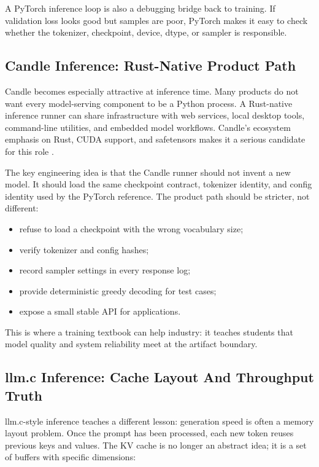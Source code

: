 A PyTorch inference loop is also a debugging bridge back to training. If validation loss
looks good but samples are poor, PyTorch makes it easy to check whether the tokenizer,
checkpoint, device, dtype, or sampler is responsible.

\subsection{Candle Inference: Rust-Native Product Path}

Candle becomes especially attractive at inference time. Many products do not want every
model-serving component to be a Python process. A Rust-native inference runner can share
infrastructure with web services, local desktop tools, command-line utilities, and
embedded model workflows. Candle's ecosystem emphasis on Rust, CUDA support, and
safetensors makes it a serious candidate for this role \cite{huggingfacecandle}.

The key engineering idea is that the Candle runner should not invent a new model. It
should load the same checkpoint contract, tokenizer identity, and config identity used by
the PyTorch reference. The product path should be stricter, not different:

\begin{itemize}
  \item refuse to load a checkpoint with the wrong vocabulary size;
  \item verify tokenizer and config hashes;
  \item record sampler settings in every response log;
  \item provide deterministic greedy decoding for test cases;
  \item expose a small stable API for applications.
\end{itemize}

This is where a training textbook can help industry: it teaches students that model
quality and system reliability meet at the artifact boundary.

\subsection{llm.c Inference: Cache Layout And Throughput Truth}

llm.c-style inference teaches a different lesson: generation speed is often a memory
layout problem. Once the prompt has been processed, each new token reuses previous keys
and values. The KV cache is no longer an abstract idea; it is a set of buffers with
specific dimensions:

